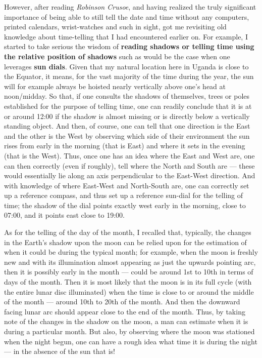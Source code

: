 \documentclass[a4paper]{article}
\begin{document}
However, after reading \textit{Robinson Crusoe}, and having realized the truly significant importance of being able to still tell the date and time without any computers, printed calendars, wrist-watches and such in sight, got me revisiting old knowledge about time-telling that I had encountered earlier on. For example, I started to take serious the wisdom of \textbf{reading shadows or telling time using the relative position of shadows} such as would be the case when one leverages \textbf{sun dials}. Given that my natural location here in Uganda is close to the Equator, it means, for the vast majority of the time during the year, the sun will for example always be hoisted nearly vertically above one's head at noon/midday. So that, if one consults the shadows of themselves, trees or poles established for the purpose of telling time, one can readily conclude that it is at or around 12:00 if the shadow is almost missing or is directly below a vertically standing object. And then, of course, one can tell that one direction is the East and the other is the West by observing which side of their environment the sun rises from early in the morning (that is East) and where it sets in the evening (that is the West). Thus, once one has an idea where the East and West are, one can then correctly (even if roughly), tell where the North and South are --- these would essentially lie along an axis perpendicular to the East-West direction. And with knowledge of where East-West and North-South are, one can correctly set up a reference compass, and thus set up a reference sun-dial for the telling of time; the shadow of the dial points exactly west early in the morning, close to 07:00, and it points east close to 19:00. 

As for the telling of the day of the month, I recalled that, typically, the changes in the Earth's shadow upon the moon can be relied upon for the estimation of when it could be during the typical month; for example, when the moon is freshly new and with its illumination almost appearing as just the upwards pointing arc, then it is possibly early in the month --- could be around 1st to 10th in terms of days of the month. Then it is most likely that the moon is in its full cycle (with the entire lunar disc illuminated) when the time is close to or around the middle of the month --- around 10th to 20th of the month. And then the downward facing lunar arc should appear close to the end of the month. Thus, by taking note of the changes in the shadow on the moon, a man can estimate when it is during a particular month. But also, by observing where the moon was stationed when the night begun, one can have a rough idea what time it is during the night --- in the absence of the sun that is! 
\end{document}
